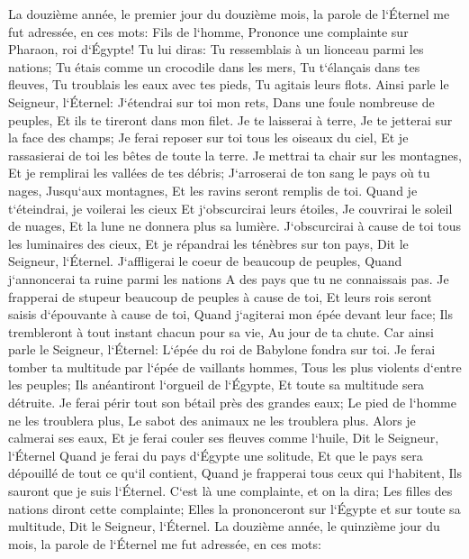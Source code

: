 \verse La douzième année, le premier jour du douzième mois, la parole de l`Éternel me fut adressée, en ces mots: 
\verse Fils de l`homme, Prononce une complainte sur Pharaon, roi d`Égypte! Tu lui diras: Tu ressemblais à un lionceau parmi les nations; Tu étais comme un crocodile dans les mers, Tu t`élançais dans tes fleuves, Tu troublais les eaux avec tes pieds, Tu agitais leurs flots. 
\verse Ainsi parle le Seigneur, l`Éternel: J`étendrai sur toi mon rets, Dans une foule nombreuse de peuples, Et ils te tireront dans mon filet. 
\verse Je te laisserai à terre, Je te jetterai sur la face des champs; Je ferai reposer sur toi tous les oiseaux du ciel, Et je rassasierai de toi les bêtes de toute la terre. 
\verse Je mettrai ta chair sur les montagnes, Et je remplirai les vallées de tes débris; 
\verse J`arroserai de ton sang le pays où tu nages, Jusqu`aux montagnes, Et les ravins seront remplis de toi. 
\verse Quand je t`éteindrai, je voilerai les cieux Et j`obscurcirai leurs étoiles, Je couvrirai le soleil de nuages, Et la lune ne donnera plus sa lumière. 
\verse J`obscurcirai à cause de toi tous les luminaires des cieux, Et je répandrai les ténèbres sur ton pays, Dit le Seigneur, l`Éternel. 
\verse J`affligerai le coeur de beaucoup de peuples, Quand j`annoncerai ta ruine parmi les nations A des pays que tu ne connaissais pas. 
\verse Je frapperai de stupeur beaucoup de peuples à cause de toi, Et leurs rois seront saisis d`épouvante à cause de toi, Quand j`agiterai mon épée devant leur face; Ils trembleront à tout instant chacun pour sa vie, Au jour de ta chute. 
\verse Car ainsi parle le Seigneur, l`Éternel: L`épée du roi de Babylone fondra sur toi. 
\verse Je ferai tomber ta multitude par l`épée de vaillants hommes, Tous les plus violents d`entre les peuples; Ils anéantiront l`orgueil de l`Égypte, Et toute sa multitude sera détruite. 
\verse Je ferai périr tout son bétail près des grandes eaux; Le pied de l`homme ne les troublera plus, Le sabot des animaux ne les troublera plus. 
\verse Alors je calmerai ses eaux, Et je ferai couler ses fleuves comme l`huile, Dit le Seigneur, l`Éternel 
\verse Quand je ferai du pays d`Égypte une solitude, Et que le pays sera dépouillé de tout ce qu`il contient, Quand je frapperai tous ceux qui l`habitent, Ils sauront que je suis l`Éternel. 
\verse C`est là une complainte, et on la dira; Les filles des nations diront cette complainte; Elles la prononceront sur l`Égypte et sur toute sa multitude, Dit le Seigneur, l`Éternel. 
\verse La douzième année, le quinzième jour du mois, la parole de l`Éternel me fut adressée, en ces mots: 
